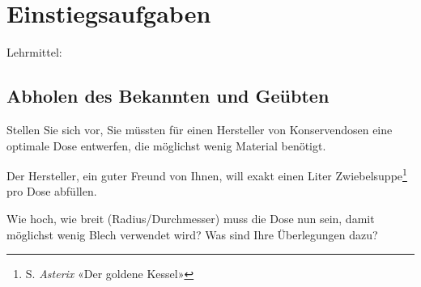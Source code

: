 
\section*{Einstiegsaufgaben}
Lehrmittel:

\subsection*{Abholen des Bekannten und Geübten}

Stellen Sie sich vor, Sie müssten für einen Hersteller von
Konservendosen eine optimale Dose entwerfen, die möglichst wenig
Material benötigt.

\begin{center}
\end{center}

Der Hersteller, ein guter Freund von Ihnen, will exakt einen Liter
Zwiebelsuppe\footnote{S. \textit{Asterix} «Der goldene Kessel»} pro
Dose abfüllen.

Wie hoch, wie breit (Radius/Durchmesser) muss die Dose nun sein,
damit möglichst wenig Blech verwendet wird? Was sind Ihre
Überlegungen dazu?
